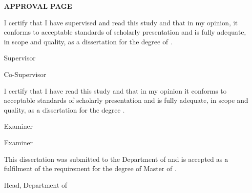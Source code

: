\documentclass[a4paper, oneside]{memoir}
\begin{document}
\pagestyle{plain}


\begin{center}
\fontsize{14bp}{16bp}
\textbf{\MakeUppercase{Approval Page}}
\end{center}

\vspace{24pt}

\fontsize{12bp}{14bp}
\noindent I certify that I have supervised and read this study and that in my opinion, it 
conforms to acceptable standards of scholarly presentation and is fully 
adequate, in scope and quality, as a dissertation for the degree of \myDegree.
\\[24pt]

\hfill \makebox[2in]{\dotfill}

\hfill \mySupervisor

\hfill Supervisor
\\[24pt]


\ifdefined\myCoSupervisor
  \hfill \makebox[2in]{\dotfill}

  \hfill \myCoSupervisor

  \hfill Co-Supervisor\\[24pt]
\fi

\ifdefined\myExaminerOne
  \noindent I certify that I have read this study and that in my opinion it 
  conforms to acceptable standards of scholarly presentation and is fully 
  adequate, in scope and quality, as a dissertation for the degree 
  \myDegree.\\[24pt]

  \hfill \makebox[2in]{\dotfill}

  \hfill \myExaminerOne

  \hfill Examiner\\[24pt]

  \ifdefined\myExaminerTwo

    \hfill \makebox[2in]{\dotfill}

    \hfill \myExaminerTwo

    \hfill Examiner\\[24pt]
  \fi
\fi

\ifdefined\myDepartmentHead
  \noindent This dissertation was submitted to the Department of \myDepartment and is accepted as a fulfilment of the requirement for the degree of Master of \mySubject.\\[24pt]

  \hfill \makebox[2in]{\dotfill}

  \hfill \myDepartmentHead

  \hfill Head, Department of \myDepartment\\[24pt]
\fi
\end{document}
